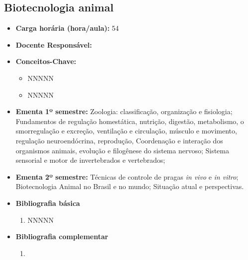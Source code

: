 \documentclass[11pt,fleqn]{book} %
\begin{document}
\subsection{Biotecnologia animal}\label{disc:biotecAnimal}
\begin{itemize}
	\item \textbf{Carga horária (hora/aula):} 54
	\item \textbf{Docente Responsável:}
	\item \textbf{Conceitos-Chave:}
	\begin{itemize}
		\item NNNNN
		\item NNNNN
	\end{itemize}
	\item \textbf{Ementa 1º semestre:}	
	Zoologia: classificação, organização e fisiologia;
	Fundamentos de regulação homestática, nutrição, digestão, metabolismo, o smorregulação e excreção, ventilação e circulação, músculo e movimento, regulação neuroendócrina, reprodução, Coordenação e interação dos organismos animais, evolução e filogênese do sistema nervoso; 
	Sistema sensorial e motor de invertebrados e vertebrados; 
	\item \textbf{Ementa 2º semestre:}	
	Técnicas de controle de pragas \textit{in vivo} e \textit{in vitro};
	Biotecnologia Animal no Brasil e no mundo; 
	Situação atual e perspectivas.
	\item \textbf{Bibliografia básica}
	\begin{enumerate}
		\item NNNNN
	\end{enumerate}
	\item \textbf{Bibliografia complementar}
	\begin{enumerate}
		\item 
	\end{enumerate}	
\end{itemize}

\newpage
\end{document}
